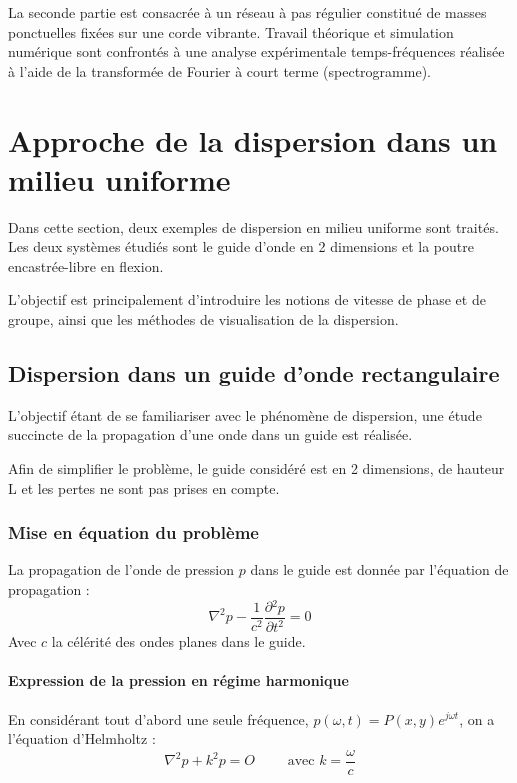 \documentclass[a4paper,11pt]{report} %
\begin{document}
 
La seconde partie est consacrée à un réseau à pas régulier constitué de masses ponctuelles fixées sur une corde vibrante. Travail théorique et simulation numérique sont confrontés à une analyse expérimentale temps-fréquences réalisée à l'aide de la transformée de Fourier à court terme (spectrogramme).

\setcounter{section}{0}

\chapter{Approche de la dispersion dans un milieu uniforme}
Dans cette section, deux exemples de dispersion en milieu uniforme sont traités. Les deux systèmes étudiés sont le guide d'onde en 2 dimensions et la poutre encastrée-libre en flexion. 

L'objectif est principalement d'introduire les notions de vitesse de phase et de groupe, ainsi que les méthodes de visualisation de la dispersion.	


\section{Dispersion dans un guide d'onde rectangulaire}

L'objectif étant de se familiariser avec le phénomène de dispersion, une étude succincte de la propagation d'une onde dans un guide est réalisée.

Afin de simplifier le problème, le guide considéré est en 2 dimensions, de hauteur L et les pertes ne sont pas prises en compte.

\subsection{Mise en équation du problème}

La propagation de l'onde de pression $p$ dans le guide est donnée par l'équation de propagation : 
\begin{equation*}
\nabla^2p - \frac{1}{c^2}\frac{\partial{^2p}}{\partial{t}^2} = 0
\end{equation*}
Avec $c$ la célérité des ondes planes dans le guide.

\subsubsection{Expression de la pression en régime harmonique}

En considérant tout d'abord une seule fréquence, $p(\omega,t) = P(x,y)e^{j\omega t}$, on a l'équation d'Helmholtz : 
\begin{equation}\label{helm}
\nabla^2p + k^2p = O \qquad \text{ avec } k = \frac{\omega}{c}
\end{equation}
\end{document}
